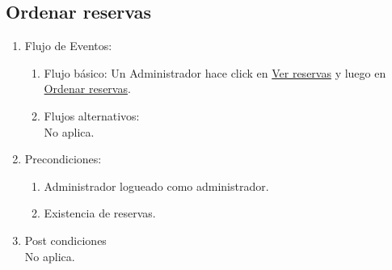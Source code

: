 \documentclass[a4paper,11pt]{article}
\begin{document}
\subsection{Ordenar reservas}
\begin{enumerate}


    \begin{enumerate}
    \item Descripción breve: \\
        Se ordenan los listados de reservas.
    \item Actores \\
        Administrador.
    \item Disparadores: \\
        Click en el botón \underline{Ordenar reservas}
        dentro de cualquier listado de reservas.
    \end{enumerate}

    \item Flujo de Eventos: 

    \begin{enumerate}

        \item Flujo básico:
            Un Administrador hace click en \underline{Ver reservas} y luego
            en \underline{Ordenar reservas}.
        \item Flujos alternativos:\\
            No aplica.
    \end{enumerate}

    \item Precondiciones: \\
        \begin{enumerate}
            \item Administrador logueado como administrador.
            \item Existencia de reservas.
        \end{enumerate}

    \item Post condiciones \\
        No aplica.

\end{enumerate}
\end{document}
